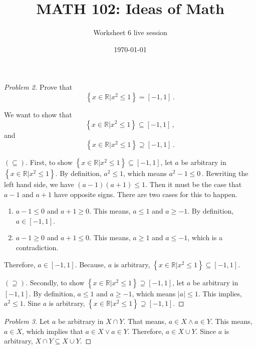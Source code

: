 \documentclass[12pt]{amsart}
\title{ MATH 102: Ideas  of Math }
\author{ Worksheet 6 live session }
\date{\today}
\begin{document}
\maketitle

\begin{proof}[Problem 2]
    Prove that 
    \begin{equation*}
        \left\{ x \in \mathbb{R} | x^2 \leq 1  \right\}
        = 
        [-1,1]\,.
    \end{equation*}

    We want to show that
    \begin{equation*}
        \left\{ x \in \mathbb{R} | x^2 \leq 1  \right\}
        \subseteq 
        [-1,1]\,,
    \end{equation*}
    and
    \begin{equation*}
        \left\{ x \in \mathbb{R} | x^2 \leq 1  \right\}
        \supseteq 
        [-1,1]\,.
    \end{equation*}

    $(\subseteq)$. First, to show  $
        \left\{ x \in \mathbb{R} | x^2 \leq 1  \right\}
        \subseteq 
        [-1,1]$, let $a$ be arbitrary in 
        $\left\{ x \in \mathbb{R} | x^2 \leq 1  \right\}$.
        By definition, $a^2 \leq 1$, which means
        $a^2 - 1 \leq 0 \,.$
        Rewriting the left hand side, we have
        $(a-1)(a+1) \leq 1$.
        Then it must be the case that $a-1$ and $a+1$ have opposite signs.
        There are two cases for this to happen.
        \begin{enumerate}
            \item $a-1 \leq 0$ and $a+1 \geq 0$.
                This means, $a\leq 1$ and $a\geq -1$. By definition,
                $a\in [-1,1]$.
            \item $a-1 \geq 0$ and $a+1 \leq 0$. This means, $a\geq 1$ and $a\leq -1$, which is a contradiction.
        \end{enumerate}
        Therefore, $a\in [-1,1]$. Because, $a$ is arbitrary, 
$ \left\{ x \in \mathbb{R} | x^2 \leq 1  \right\}
        \subseteq 
        [-1,1]$.


        $(\supseteq).$ Secondly, to show 
        $ \left\{ x \in \mathbb{R} | x^2 \leq 1  \right\} \supseteq 
        [-1,1]$, let $a$ be arbitrary in $[-1,1]$.
        By definition, $a\leq 1$ and $a\geq -1$, which means $|a| \leq 1$.
        This implies, $a^2 \leq 1$.
        Sine $a$ is arbitrary, 
        $ \left\{ x \in \mathbb{R} | x^2 \leq 1  \right\} \supseteq 
        [-1,1]$.
\end{proof}


\begin{proof}[Problem 3]
    Let $a$ be arbitrary in $X\cap Y$. That means, $a \in X \wedge a \in Y$.
    This means, $a\in X$, which implies that $a\in X \vee a\in Y$. 
    Therefore, $a\in X\cup Y$.
    Since $a$ is arbitrary, $X\cap Y \subseteq X\cup Y$.
\end{proof}
\end{document}
